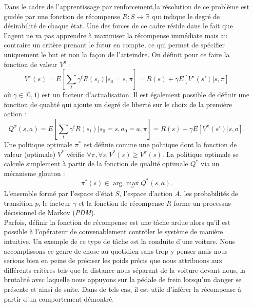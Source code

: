 \documentclass[publibook-draft]{CAp2012}
\begin{document}
Dans le cadre de l'apprentissage par renforcement,la résolution de ce problème est guidée par une fonction de récompense $R : S \rightarrow \mathbb{R}$ qui indique le degré de désirabilité de chaque état. Une des forces de ce cadre réside dans le fait que l'agent ne va pas apprendre à maximiser la récompense immédiate mais au contraire un critère prenant le futur en compte, ce qui permet de spécifier uniquement le but et non la façon de l'atteindre. On définit pour ce faire la fonction de valeur $V^\pi$ :
\begin{equation}
\label{Vdef.eqn}
V^\pi(s) = E[\sum_t\gamma^tR(s_t)|s_0=s,\pi]=R(s) + \gamma E[V^\pi(s')|s,\pi]
\end{equation}
où $\gamma \in [0,1)$ est un facteur d'actualisation. Il est également possible de définir une fonction de qualité qui ajoute un degré de liberté sur le choix de la première action :
\begin{equation}
\label{Qdef.eqn}
Q^\pi(s,a) = E[\sum_t\gamma^tR(s_t)|s_0=s,a_0=a,\pi] = R(s) + \gamma E[V^\pi(s')|s,a].
\end{equation}
  Une politique optimale $\pi^*$ est définie comme une politique dont la fonction de valeur (optimale) $V^*$ vérifie $\forall \pi, \forall s, V^*(s) \geq V^\pi(s)$. La politique optimale se calcule simplement à partir de la fonction de qualité optimale $Q^*$ via un mécanisme glouton :
\begin{equation}
\label{greedy.eqn}
\pi^*(s) \in \arg\max_a Q^*(s,a).
\end{equation}
L'ensemble formé par l'espace d'état $S$, l'espace d'action $A$, les probabilités de transition $p$, le facteur $\gamma$ et la fonction de récompense $R$ forme un processus décisionnel de Markov (\emph{PDM}).\\

Parfois, définir la fonction de récompense est une tâche ardue alors qu'il est possible à l'opérateur de convenablement contrôler le système de manière intuitive. Un exemple de ce type de tâche est la conduite d'une voiture. Nous accomplissons ce genre de chose au quotidien sans trop y penser mais nous serions bien en peine de préciser les poids précis que nous attribuons aux différents critères tels que la distance nous séparant de la voiture devant nous, la brutalité avec laquelle nous appuyons sur la pédale de frein lorsqu'un danger se présente et ainsi de suite. Dans de tels cas, il est utile d'inférer la récompense à partir d'un comportement démontré.\\
\end{document}
